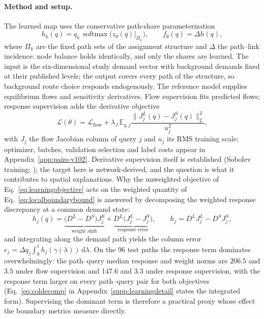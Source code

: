 \documentclass[a4paper,fleqn]{cas-sc}
\newcommand{\E}{\mathbb{E}}
\newcommand{\norm}[1]{\lVert #1 \rVert}
\begin{document}
\paragraph{Method and setup.}
The learned map uses the conservative path-share parameterization
\begin{equation}
h_k(q)=q_k\,\operatorname{softmax}\bigl(z_\theta(q)\bigr|_{\Pi_k}\bigr),
\qquad f_\theta(q)=\Delta h(q),
\label{eq:consparam}
\end{equation}
where $\Pi_k$ are the fixed path sets of the assignment structure and
$\Delta$ the path--link incidence: node balance holds identically, and
only the shares are learned. The input is the six-dimensional study
demand vector with background demands fixed at their published levels;
the output covers every path of the structure, so background route
choice responds endogenously. The reference model supplies equilibrium
flows and sensitivity derivatives. Flow supervision fits predicted
flows; response supervision adds the derivative objective
\begin{equation}
\mathcal L(\theta)=\mathcal L_{\mathrm{flow}}
+\lambda_J\,\E_{q,j}\frac{\norm{J_j^L(q)-J_j^S(q)}_2^2}{u_j^2},
\label{eq:learningobjective}
\end{equation}
with $J_j$ the flow Jacobian column of query $j$ and $u_j$ its RMS
training scale; optimizer, batches, validation selection and label
costs appear in Appendix~\ref{app:pairs-v102}. Derivative supervision
itself is established (Sobolev training;
\citealp{czarnecki2017sobolev,yuan2022sobolev}); the target here is
network-derived, and the question is what it contributes to spatial
explanations.
Why the unweighted objective of Eq.~\eqref{eq:learningobjective} acts
on the weighted quantity of Eq.~\eqref{eq:localboundarybound} is
answered by decomposing the weighted response discrepancy at a common
demand state:
\begin{equation}
h_j(q)=\underbrace{\bigl(D^L-D^S\bigr)J_j^S}_{\text{weight shift}}
+\underbrace{D^L\bigl(J_j^L-J_j^S\bigr)}_{\text{response error}},
\qquad h_j=D^LJ_j^L-D^SJ_j^S,
\label{eq:coldecompmain}
\end{equation}
and integrating along the demand path yields the column error
$e_j=\Delta q_j\int_0^1h_j(\gamma(\lambda))\,\mathrm{d}\lambda$. On the
96 test paths the response term dominates overwhelmingly: the
path--query median response and weight norms are $206.5$ and $3.5$
under flow supervision and $147.6$ and $3.3$ under response
supervision, with the response term larger on every path--query pair
for both objectives (Eq.~\eqref{eq:coldecomp} in
Appendix~\ref{supp:learningdetail} states the integrated form).
Supervising the dominant term is therefore a
practical proxy whose effect the boundary metrics measure directly.
\end{document}
